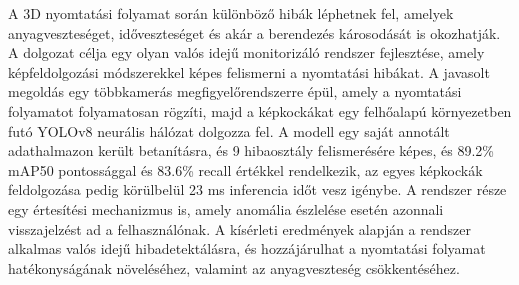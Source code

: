 A 3D nyomtatási folyamat során különböző hibák léphetnek fel, amelyek anyagveszteséget, időveszteséget és akár a berendezés károsodását is okozhatják.
A dolgozat célja egy olyan valós idejű monitorizáló rendszer fejlesztése, amely képfeldolgozási módszerekkel képes felismerni a nyomtatási hibákat.
A javasolt megoldás egy többkamerás megfigyelőrendszerre épül, amely a nyomtatási folyamatot folyamatosan rögzíti, majd a képkockákat egy felhőalapú
környezetben futó YOLOv8 neurális hálózat dolgozza fel. A modell egy saját annotált adathalmazon került betanításra, és 9 hibaosztály felismerésére képes, és 89.2\% mAP50 pontossággal
és 83.6\% recall értékkel rendelkezik, az egyes képkockák feldolgozása pedig körülbelül 23 ms inferencia időt vesz igénybe.
A rendszer része egy értesítési mechanizmus is, amely anomália észlelése esetén azonnali visszajelzést ad a felhasználónak.
A kísérleti eredmények alapján a rendszer alkalmas valós idejű hibadetektálásra, és hozzájárulhat a nyomtatási folyamat hatékonyságának növeléséhez,
valamint az anyagveszteség csökkentéséhez.